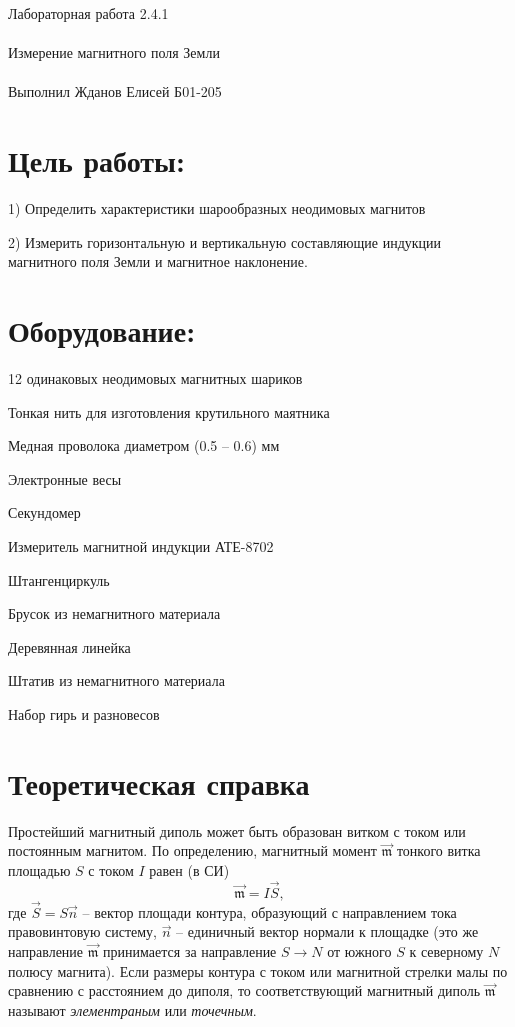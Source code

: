 \documentclass{astroedu-lab}
\begin{document}
\pagestyle{plain}

\begin{problem}{\huge Лабораторная работа 2.4.1\\\\Измерение магнитного поля Земли\\\\Выполнил Жданов Елисей Б01-205}

\section{Цель работы:}

1) Определить характеристики шарообразных неодимовых магнитов 

2) Измерить горизонтальную и вертикальную составляющие индукции магнитного поля Земли и магнитное наклонение.

\section{Оборудование:}

12 одинаковых неодимовых магнитных шариков

Тонкая нить для изготовления крутильного маятника

Медная проволока диаметром (0.5 – 0.6) мм

Электронные весы

Секундомер

Измеритель магнитной индукции АТЕ-8702

Штангенциркуль

Брусок из немагнитного материала

Деревянная линейка

Штатив из немагнитного материала

Набор гирь и разновесов

\section{Теоретическая справка}

Простейший магнитный диполь может быть образован витком с током или постоянным магнитом. По определению, магнитный момент $\vec{\mathfrak{m}}$ тонкого витка площадью $S$ с током $I$ равен (в СИ)\[\vec{\mathfrak{m}}=I\vec{S},\]где $\vec{S}=S\vec{n}$ -- вектор площади контура, образующий с направлением тока правовинтовую систему, $\vec{n}$ -- единичный вектор нормали к площадке (это же направление $\vec{\mathfrak{m}}$ принимается за направление $S\to N$ от южного $S$ к северному $N$ полюсу магнита). Если размеры контура с током или магнитной стрелки малы по сравнению с расстоянием до диполя, то соответствующий магнитный диполь $\vec{\mathfrak{m}}$ называют \textit{элементраным} или \textit{точечным}.


\end{problem}
\end{document}
